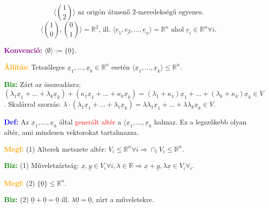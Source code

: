 \documentclass[../szamtud.tex]{subfiles}
\begin{document}
        \begin{equation*}
            \langle \binom{1}{2} \rangle
            \textrm{ az origón átmenő 2-meredekségű egyenes.} 
        \end{equation*}
        \begin{equation*}
            \langle \binom{1}{0}, \binom{0}{1}\rangle = \mathbb{R}^2 
            \textrm{, ill. }
            \langle \underline{e}_1, \underline{e_2}, \dots, \underline{e}_n \rangle = \mathbb{R}^n
            \textrm{ ahol }
            \underline{e}_i \in \mathbb{R}^n \forall i.
        \end{equation*}

        \textcolor{purple}{\textbf{Konvenció:}} $\langle \emptyset \rangle := \{\underline{0}\}$.

        \textcolor{orange}{\textbf{Állítás:}} Tetszőleges $\underline{x}_1, \dots, \underline{x}_k \in \mathbb{R}^n$ esetén $\langle \underline{x}_1, \dots, \underline{x}_k \rangle \leq \mathbb{R}^n$.

        \textcolor{green}{\textbf{Biz:}} Zárt az összeadásra: $(\lambda_1 \underline{x}_1 + \dots + \lambda_k \underline{x}_k) + (\kappa_1 \underline{x}_1 + \dots + \kappa_k \underline{x}_k) = (\lambda_1 + \kappa_1) \underline{x}_1 + \dots + (\lambda_k + \kappa_k) \underline{x}_k \in V$. Skalárral szorzás: $\lambda \cdot (\lambda_1 \underline{x}_1 + \dots + \lambda_1 \underline{x}_k) = \lambda \lambda_1 \underline{x}_1 + \dots + \lambda \lambda_k \underline{x}_k \in V$.

        \textcolor{blue}{\textbf{Def:}} Az $\underline{x}_1, \dots, \underline{x}_k$ által \textcolor{red}{generált altér} a $\langle \underline{x}_1, \dots, \underline{x}_k$ halmaz. Ez a legszűkebb olyan altér, ami mindezen vektorokat tartalmazza.

        \textcolor{orange}{\textbf{Megf:}} (1) Alterek metszete altér: $V_i \leq \mathbb{R}^n \forall i \Rightarrow \cap_i V_i \leq \mathbb{R}^n$.

        \textcolor{green}{\textbf{Biz:}} (1) Műveletzártság: $\underline{x},\underline{y} \in V_i \forall i, \lambda \in \mathbb{R} \Rightarrow \underline{x} + \underline{y}, \lambda\underline{x} \in V_i \forall_i$.

        \textcolor{orange}{\textbf{Megf:}} (2) $\{\underline{0}\} \leq \mathbb{R}^n$. 

        \textcolor{green}{\textbf{Biz:}} (2) $\underline{0} + \underline{0} = \underline{0}$ ill. $\lambda\underline{0} = \underline{0}$, zárt a műveletekre.
        
\end{document}
